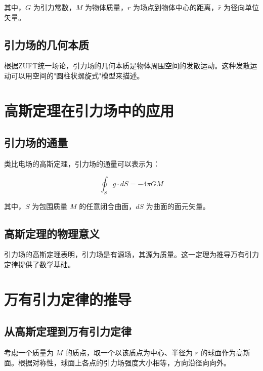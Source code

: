 \documentclass[12pt,a4paper]{article}
\begin{document}
其中，$G$ 为引力常数，$M$ 为物体质量，$r$ 为场点到物体中心的距离，$\hat{r}$ 为径向单位矢量。

\subsection{引力场的几何本质}
\label{subsection:gravitational_field_nature}

根据ZUFT统一场论，引力场的几何本质是物体周围空间的发散运动。这种发散运动可以用空间的"圆柱状螺旋式"模型来描述。

\section{高斯定理在引力场中的应用}
\label{section:gauss_theorem_gravitational}

\subsection{引力场的通量}
\label{subsection:gravitational_flux}

类比电场的高斯定理，引力场的通量可以表示为：

\begin{equation}
\oint_S g \cdot dS = -4\pi G M

\end{equation}

其中，$S$ 为包围质量 $M$ 的任意闭合曲面，$dS$ 为曲面的面元矢量。

\subsection{高斯定理的物理意义}
\label{subsection:gauss_theorem_meaning}

引力场的高斯定理表明，引力场是有源场，其源为质量。这一定理为推导万有引力定律提供了数学基础。

\section{万有引力定律的推导}
\label{section:derivation_gravitational_law}

\subsection{从高斯定理到万有引力定律}
\label{subsection:from_gauss_to_law}

考虑一个质量为 $M$ 的质点，取一个以该质点为中心、半径为 $r$ 的球面作为高斯面。根据对称性，球面上各点的引力场强度大小相等，方向沿径向向外。
\end{document}
